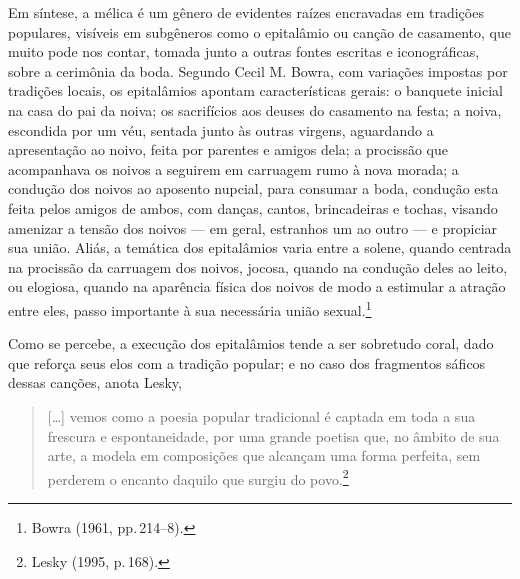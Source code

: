 Em síntese, a mélica é um gênero de evidentes raízes
encravadas em tradições populares, visíveis em subgêneros
como o epitalâmio ou canção de casamento, que muito pode nos contar, tomada
junto a outras fontes escritas e iconográficas, sobre a cerimônia
da boda. Segundo Cecil M. Bowra, com variações
impostas por tradições locais, os epitalâmios apontam características gerais:
o banquete inicial na casa do pai da noiva; os sacrifícios aos
deuses do casamento na festa; a noiva, escondida por um véu, sentada junto às
outras virgens, aguardando a apresentação ao noivo, feita por parentes e amigos
dela; a procissão que acompanhava os noivos a seguirem em carruagem rumo à nova
morada; a condução dos noivos ao aposento nupcial, para consumar a boda,
condução esta feita pelos amigos de ambos, com danças, cantos, brincadeiras e
tochas, visando amenizar a tensão dos noivos --- em geral, estranhos um ao outro
--- e propiciar sua união. Aliás, a temática dos epitalâmios varia entre a
solene, quando centrada na procissão da carruagem dos noivos, jocosa, quando na
condução deles ao leito, ou elogiosa, quando na aparência física dos noivos de
modo a estimular a atração entre eles, passo importante à sua necessária união
sexual.\footnote{ Bowra (1961, pp.\,214--8).}

Como se percebe, a execução dos epitalâmios tende a ser sobretudo coral, dado
que reforça seus elos com a tradição popular; e no caso dos fragmentos sáficos
dessas canções, anota Lesky, 

\begin{quote}
{[}\ldots{}{]} vemos como a poesia popular
tradicional é captada em toda a sua frescura e espontaneidade, por uma grande
poetisa que, no âmbito de sua arte, a modela em composições que alcançam uma
forma perfeita, sem perderem o encanto daquilo que surgiu do povo.\footnote{ Lesky (1995, p.\,168).}
\end{quote}

